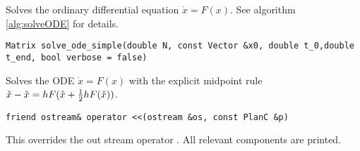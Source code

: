 Solves the ordinary differential equation $\dot x = F(x)$. See algorithm \ref{alg:solveODE} for details.
\begin{lstlisting}[numbers=none]
Matrix solve_ode_simple(double N, const Vector &x0, double t_0,double t_end, bool verbose = false)
\end{lstlisting}
Solves the ODE $\dot x = F(x)$ with the explicit midpoint rule $\check{x} - \hat{x} = h F(\check{x} + \tfrac12 h F(\check{x}))$.
\begin{lstlisting}[numbers=none]
friend ostream& operator <<(ostream &os, const PlanC &p)
\end{lstlisting}
This overrides the out stream operator \src{<<}. All relevant components are printed.

